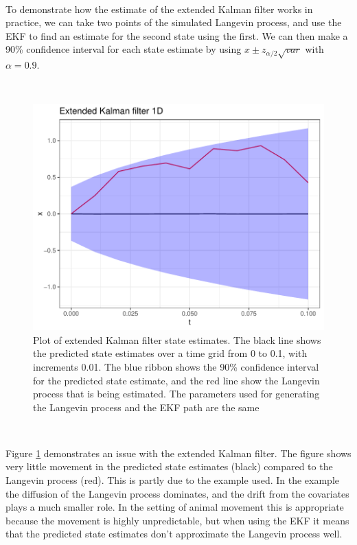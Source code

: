 \

To demonstrate how the estimate of the extended Kalman filter works in practice, we can take two points of the simulated Langevin process, and use the EKF to find an estimate for the second state using the first. We can then make a 90\% confidence interval for each state estimate by using $x±z_{\alpha/2}\sqrt{var}
$ with $\alpha = 0.9$.

\


\begin{figure}[H]
    \centering
    \includegraphics[width=\linewidth]{Images/ch3/EKF figure 1D.pdf}
    \caption[Extended Kalman filter]{Plot of extended Kalman filter state estimates. The black line shows the predicted state estimates over a time grid from 0 to 0.1, with increments 0.01. The blue ribbon shows the 90\% confidence interval for the predicted state estimate, and the red line show the Langevin process that is being estimated. The parameters used for generating the Langevin process and the EKF path are the same}
    \label{fig:EKF 1D}
\end{figure}

\


Figure \ref{fig:EKF 1D} demonstrates an issue with the extended Kalman filter. The figure shows very little movement in the predicted state estimates (black) compared to the Langevin process (red). This is partly due to the example used. In the example the diffusion of the Langevin process dominates, and the drift from the covariates plays a much smaller role. In the setting of animal movement this is appropriate because the movement is highly unpredictable, but when using the EKF it means that the predicted state estimates don't approximate the Langevin process well. 

